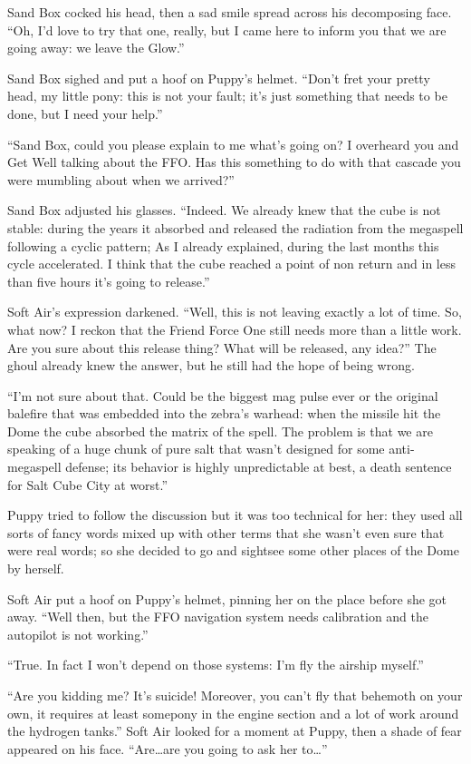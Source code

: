 Sand Box cocked his head, then a sad smile spread across his decomposing face. ``Oh, I'd love to try that one, really, but I came here to inform you that we are going away: we leave the Glow.''


Sand Box sighed and put a hoof on Puppy's helmet. ``Don't fret your pretty head, my little pony: this is not your fault; it's just something that needs to be done, but I need your help.''

``Sand Box, could you please explain to me what's going on? I overheard you and Get Well talking about the FFO. Has this something to do with that cascade you were mumbling about when we arrived?''

Sand Box adjusted his glasses. ``Indeed. We already knew that the cube is not stable: during the years it absorbed and released the radiation from the megaspell following a cyclic pattern; As I already explained, during the last months this cycle accelerated. I think that the cube reached a point of non return and in less than five hours it's going to release.''

Soft Air's expression darkened. ``Well, this is not leaving exactly a lot of time. So, what now? I reckon that the Friend Force One still needs more than a little work. Are you sure about this release thing? What will be released, any idea?'' The ghoul already knew the answer, but he still had the hope of being wrong.

``I'm not sure about that. Could be the biggest mag pulse ever or the original balefire that was embedded into the zebra's warhead: when the missile hit the Dome the cube absorbed the matrix of the spell. The problem is that we are speaking of a huge chunk of pure salt that wasn't designed for some anti-megaspell defense; its behavior is highly unpredictable at best, a death sentence for Salt Cube City at worst.''

Puppy tried to follow the discussion but it was too technical for her: they used all sorts of fancy words mixed up with other terms that she wasn't even sure that were real words; so she decided to go and sightsee some other places of the Dome by herself.

Soft Air put a hoof on Puppy's helmet, pinning her on the place before she got away. ``Well then, but the FFO navigation system needs calibration and the autopilot is not working.''

``True. In fact I won't depend on those systems: I'm fly the airship myself.''

``Are you kidding me? It's suicide! Moreover, you can't fly that behemoth on your own, it requires at least somepony in the engine section and a lot of work around the hydrogen tanks.'' Soft Air looked for a moment at Puppy, then a shade of fear appeared on his face. ``Are\dots are you going to ask her to\dots''

